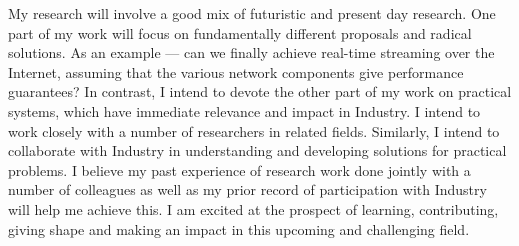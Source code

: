 \documentclass[a4paper, 10pt]{article}
\begin{document}
\begin{small}
 My research will involve a good mix of futuristic and present 
day research. 
One part of my work will focus on fundamentally different proposals and
radical solutions. As an example
--- can we finally achieve real-time streaming over the Internet,
assuming that the various network components give performance guarantees?
In contrast, I intend to devote the other part of my work 
on practical systems, which have immediate relevance and impact in Industry.
I intend to work closely with a number of
researchers in related fields. Similarly, I intend to
collaborate with Industry in understanding and developing solutions
for practical problems. I believe my past experience of research
work done jointly with a number of colleagues as well as my prior record
of participation with Industry will help me achieve this. 
I am excited at the
prospect of learning, contributing, giving shape and making an
impact in this upcoming and challenging field.  





\vspace{0.5cm}

\end{small}
\end{document}
